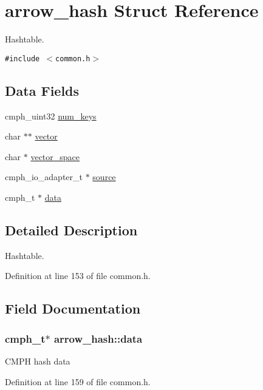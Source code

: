 \hypertarget{structarrow__hash}{
\section{arrow\_\-hash Struct Reference}
\label{structarrow__hash}
}
Hashtable.  


{\tt \#include $<$common.h$>$}

\subsection*{Data Fields}
\begin{CompactItemize}
\item 
cmph\_\-uint32 \hyperlink{structarrow__hash_f75ec1b9382f5b646007f8acb0521c15}{num\_\-keys}
\item 
char $\ast$$\ast$ \hyperlink{structarrow__hash_91eeed74d32d354b4e8b03be8b51f058}{vector}
\item 
char $\ast$ \hyperlink{structarrow__hash_298c5f151d99d62d6be200a620a4b4c3}{vector\_\-space}
\item 
cmph\_\-io\_\-adapter\_\-t $\ast$ \hyperlink{structarrow__hash_202a3f5b2689ae35543ef2c7ea84a6c2}{source}
\item 
cmph\_\-t $\ast$ \hyperlink{structarrow__hash_9f6c6f476d93187dd1436eac92bd8d53}{data}
\end{CompactItemize}


\subsection{Detailed Description}
Hashtable. 

Definition at line 153 of file common.h.

\subsection{Field Documentation}
\hypertarget{structarrow__hash_9f6c6f476d93187dd1436eac92bd8d53}{
\subsubsection[{data}]{\setlength{\rightskip}{0pt plus 5cm}cmph\_\-t$\ast$ {\bf arrow\_\-hash::data}}}
\label{structarrow__hash_9f6c6f476d93187dd1436eac92bd8d53}


CMPH hash data 

Definition at line 159 of file common.h.

